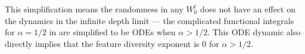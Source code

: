 This simplification means the randomness in any $W_0^l$ does not have an effect on the dynamics in the infinite depth limit --- the complicated functional integrals for $\alpha=1/2$ in  are simplified to be ODEs when $\alpha >1/2$. This ODE dynamic also directly implies that the feature diversity exponent is 0 for $\alpha > 1/2$.

